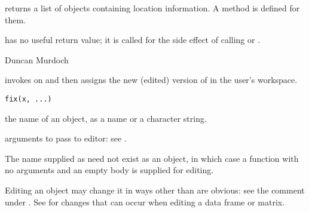 %
\begin{Value}
 returns a list of objects containing location
information.  A  method is defined for them.

 has no useful return value; it is called for the
side effect of calling  or .
\end{Value}
%
\begin{Author}\relax
Duncan Murdoch
\end{Author}
%
\begin{SeeAlso}\relax
{}
\end{SeeAlso}
%
\begin{Examples}
\end{Examples}
%
\begin{Description}\relax
{} invokes  on  and then assigns the new
(edited) version of  in the user's workspace.
\end{Description}
%
\begin{Usage}
\begin{verbatim}
fix(x, ...)
\end{verbatim}
\end{Usage}
%
\begin{Arguments}
\begin{ldescription}
\item[\code{x}] the name of an \R{} object, as a name or a character string.
\item[\code{...}] arguments to pass to editor: see .
\end{ldescription}
\end{Arguments}
%
\begin{Details}\relax
The name supplied as  need not exist as an \R{} object, in 
which case a function with no arguments and an empty body is supplied 
for editing.

Editing an \R{} object may change it in ways other than are obvious: see
the comment under .  See
 for changes that can occur when editing
a data frame or matrix.
\end{Details}
